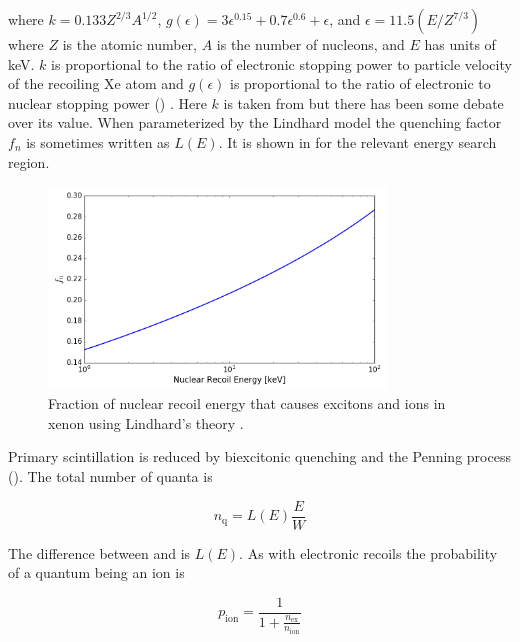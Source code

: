 \noindent where $k = 0.133Z^{2/3}A^{1/2}$, $g(\epsilon) = 3\epsilon^{0.15} + 0.7\epsilon^{0.6} + \epsilon$, and
$\epsilon = 11.5 (E / Z^{7/3})$ where $Z$ is the atomic number, $A$ is the number of nucleons, and $E$ has units of keV.  $k$ is
proportional to the ratio of
electronic stopping power to particle velocity of the recoiling Xe atom  and $g(\epsilon)$ is proportional
to the ratio of electronic to nuclear stopping power () .  Here $k$ is taken
from  but there has been some debate over its value.  When parameterized by the Lindhard model the quenching factor
$f_{n}$ is sometimes written as $L(E)$.  It is shown in  for the relevant energy search region.

\begin{figure}
\includegraphics[width=0.8\textwidth]{Lindhard}
\caption{Fraction of nuclear recoil energy that causes excitons and ions in xenon using Lindhard's theory .}
\label{fig:lindhard}
\end{figure}

Primary scintillation is reduced by biexcitonic quenching and the Penning process ().  The total
number of quanta is

\begin{equation}
n_{\mathrm{q}} = L(E) \frac{E}{W}
\label{eq:nquant_nr}
\end{equation}

\noindent The difference between  and  is $L(E)$.  As with electronic recoils the probability
of a quantum being an ion is

\begin{equation}
p_{\mathrm{ion}} = \frac{1}{1 + \frac{ n_{\mathrm{ex}} }{ n_{\mathrm{ion}} }}
\end{equation}

